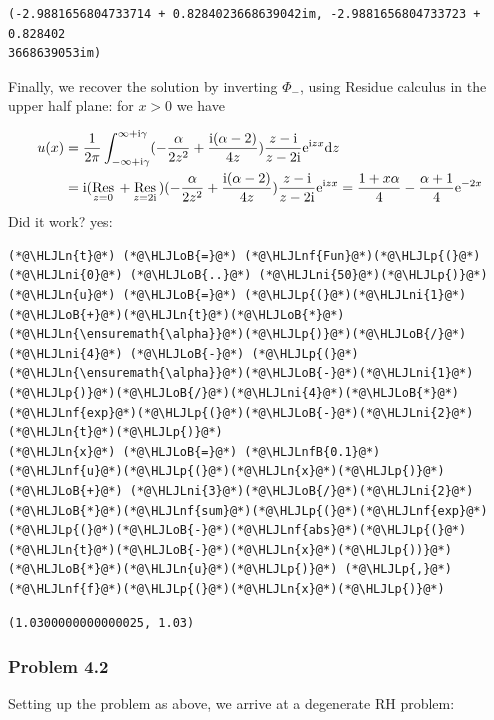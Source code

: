 \documentclass[12pt,a4paper]{article}
\newcommand{\HLJLn}[1]{#1}
\newcommand{\HLJLnf}[1]{\textcolor[RGB]{66,102,213}{#1}}
\newcommand{\HLJLnfB}[1]{\textcolor[RGB]{59,151,46}{#1}}
\newcommand{\HLJLni}[1]{\textcolor[RGB]{59,151,46}{#1}}
\newcommand{\HLJLoB}[1]{\textcolor[RGB]{102,102,102}{\textbf{#1}}}
\newcommand{\HLJLp}[1]{#1}
\def\D{ {\rm d} }
\def\I{ {\rm i} }
\def\E{ {\rm e} }
\def\Res_#1{\underset{#1}{\rm Res}\,}
\def\dz{\D z}
\begin{document}
\begin{lstlisting}
(-2.9881656804733714 + 0.8284023668639042im, -2.9881656804733723 + 0.828402
3668639053im)
\end{lstlisting}


Finally, we recover the solution by inverting  $\Phi_-$, using Residue calculus in the upper half plane: for $x > 0$ we have


\begin{align*}
u(x) &= {1 \over 2 \pi} \int_{-\infty+ \I \gamma}^{\infty + \I \gamma} (-{\alpha \over 2 z^2}+{\I (\alpha-2) \over 4 z}  ) {z - \I  \over z - 2\I}  \E^{\I z x}  \dz \\
&= \I (\Res_{z = 0} + \Res_{z = 2\I}) (-{\alpha \over 2 z^2}+{\I (\alpha-2) \over 4 z}  ) {z - \I  \over z - 2\I}  \E^{\I z x} = {1+x \alpha \over 4} - {\alpha+1 \over 4} \E^{-2 x}
\end{align*}
Did it work? yes:


\begin{lstlisting}
(*@\HLJLn{t}@*) (*@\HLJLoB{=}@*) (*@\HLJLnf{Fun}@*)(*@\HLJLp{(}@*)(*@\HLJLni{0}@*) (*@\HLJLoB{..}@*) (*@\HLJLni{50}@*)(*@\HLJLp{)}@*)
(*@\HLJLn{u}@*) (*@\HLJLoB{=}@*) (*@\HLJLp{(}@*)(*@\HLJLni{1}@*)(*@\HLJLoB{+}@*)(*@\HLJLn{t}@*)(*@\HLJLoB{*}@*)(*@\HLJLn{\ensuremath{\alpha}}@*)(*@\HLJLp{)}@*)(*@\HLJLoB{/}@*)(*@\HLJLni{4}@*) (*@\HLJLoB{-}@*) (*@\HLJLp{(}@*)(*@\HLJLn{\ensuremath{\alpha}}@*)(*@\HLJLoB{-}@*)(*@\HLJLni{1}@*)(*@\HLJLp{)}@*)(*@\HLJLoB{/}@*)(*@\HLJLni{4}@*)(*@\HLJLoB{*}@*)(*@\HLJLnf{exp}@*)(*@\HLJLp{(}@*)(*@\HLJLoB{-}@*)(*@\HLJLni{2}@*)(*@\HLJLn{t}@*)(*@\HLJLp{)}@*)
(*@\HLJLn{x}@*) (*@\HLJLoB{=}@*) (*@\HLJLnfB{0.1}@*)
(*@\HLJLnf{u}@*)(*@\HLJLp{(}@*)(*@\HLJLn{x}@*)(*@\HLJLp{)}@*) (*@\HLJLoB{+}@*) (*@\HLJLni{3}@*)(*@\HLJLoB{/}@*)(*@\HLJLni{2}@*)(*@\HLJLoB{*}@*)(*@\HLJLnf{sum}@*)(*@\HLJLp{(}@*)(*@\HLJLnf{exp}@*)(*@\HLJLp{(}@*)(*@\HLJLoB{-}@*)(*@\HLJLnf{abs}@*)(*@\HLJLp{(}@*)(*@\HLJLn{t}@*)(*@\HLJLoB{-}@*)(*@\HLJLn{x}@*)(*@\HLJLp{))}@*)(*@\HLJLoB{*}@*)(*@\HLJLn{u}@*)(*@\HLJLp{)}@*) (*@\HLJLp{,}@*) (*@\HLJLnf{f}@*)(*@\HLJLp{(}@*)(*@\HLJLn{x}@*)(*@\HLJLp{)}@*)
\end{lstlisting}

\begin{lstlisting}
(1.0300000000000025, 1.03)
\end{lstlisting}


\subsubsection{Problem 4.2}
Setting up the problem as above, we arrive at a degenerate RH problem:
\end{document}
